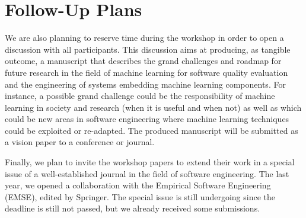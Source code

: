 
\section{Follow-Up Plans}

We are also planning to reserve time during the workshop in order to open a discussion with all participants.
This discussion aims at producing, as tangible outcome, a manuscript that describes the grand challenges and roadmap for future research in the field of machine learning for software quality evaluation and the engineering of systems embedding machine learning components.
For instance, a possible grand challenge could be the responsibility of machine learning in society and research (\eg when it is useful and when not) as well as which could be new areas in software engineering where machine learning techniques could be exploited or re-adapted.
The produced manuscript will be submitted as a vision paper to a conference or journal.

Finally, we plan to invite the workshop papers to extend their work in a special issue of a well-established journal in the field of software engineering.
The last year, we opened a collaboration with the Empirical Software Engineering (EMSE), edited by Springer.
The special issue is still undergoing since the deadline is still not passed, but we already received some submissions.
